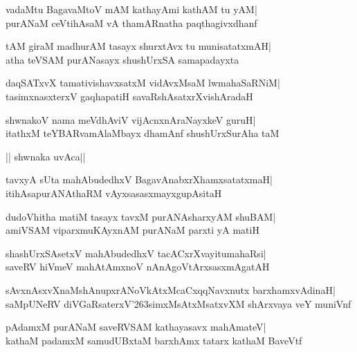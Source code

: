 \documentclass[twoside,12pt,openright]{book}
\def\S{\char'263}
\newcounter{shloka}[chapter]
\begin{document}
\begin{shloka}%
vadaMtu BagavaMtoV mAM kathayAmi kathAM tu yAM|\\
purANaM ceVtihAsaM vA thamARnatha paqthagivxdhanf
\end{shloka}

\begin{shloka}%
tAM giraM madhurAM tasayx shurxtAvx tu munisatatxmAH|\\
atha teVSAM purANasayx shushUrxSA samapadayxta
\end{shloka}

\begin{shloka}%
daqSATxvX tamativishavxsatxM vidAvxMsaM lwmahaSaRNiM|\\
tasimxnasxterxV gaqhapatiH savaRshAsatxrXvishAradaH
\end{shloka}

\begin{shloka}%
shwnakoV nama meVdhAviV vijAcnxnAraNayxkeV guruH|\\
itathxM teYBARvamAlaMbayx dhamAnf shushUrxSurAha taM
\end{shloka}

\begin{center}
|| shwnaka uvAca||
\end{center}
\begin{shloka}%
tavxyA sUta mahAbudedhxV BagavAnabxrXhamxsatatxmaH|\\
itihAsapurANAthaRM vAyxsasasxmayxgupAsitaH
\end{shloka}

\begin{shloka}%
dudoVhitha matiM tasayx tavxM purANAsharxyAM shuBAM|\\
amiVSAM viparxmuKAyxnAM purANaM parxti yA matiH
\end{shloka}

\begin{shloka}%
shashUrxSAsetxV mahAbudedhxV tacACxrXvayitumahaRsi|\\
saveRV hiVmeV mahAtAmxnoV nAnAgoVtArxsasxmAgatAH
\end{shloka}

\begin{shloka}%
sAvxnAsxvXnaMshAnupxrANoVkAtxMcaCxqqNavxnutx barxhamxvAdinaH|\\
saMpUNeRV diVGaRsaterxV\S simxMsAtxMsatxvXM shArxvaya veY muniVnf
\end{shloka}

\begin{shloka}%
pAdamxM purANaM saveRVSAM kathayasavx mahAmateV|\\
kathaM padamxM samudUBxtaM barxhAmx tatarx kathaM BaveVtf
\end{shloka}
\end{document}
